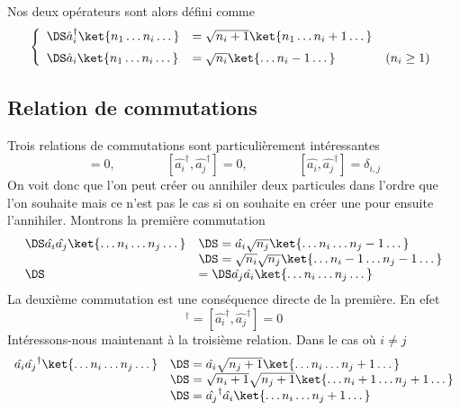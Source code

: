 Nos deux opérateurs sont alors défini comme
\begin{equation}
\left\{\begin{array}{ll}
\DS\hat{a}_i^\dagger \ket{n_1\dots n_i\dots} &= \sqrt{n_i+1}\ket{n_1\dots n_i+1\dots}\vspace{2mm}\\
\DS\hat{a}_i\ket{n_1\dots n_i\dots} &= \sqrt{n_i}\ket{\dots n_i-1\dots}\qquad\qquad (n_i\geq 1)
\end{array}\right.
\end{equation}

\subsection{Relation de commutations}
Trois relations de commutations sont particulièrement intéressantes
\begin{equation}
[\hat{a_i},\hat{a_j}]=0,\qquad\qquad[\hat{a_i}^\dagger,\hat{a_j}^\dagger]=0,\qquad\qquad [\hat{a_i},\hat{a_j}^\dagger]=\delta_{i,j}
\end{equation}
On voit donc que l'on peut créer ou annihiler deux particules dans l'ordre que l'on souhaite mais ce n'est pas le cas si 
on souhaite en créer une pour ensuite l'annihiler. Montrons la première commutation
\begin{equation}
\begin{array}{ll}
\DS\hat{a_i}\hat{a_j}\ket{\dots n_i\dots n_j\dots} &\DS= \hat{a_i}\sqrt{n_j}\ket{\dots n_i\dots n_j-1\dots}\\&\DS= \sqrt{n_i}\sqrt{n_j}\ket{\dots n_i-1\dots n_j-1\dots}\\
\DS&= \DS\hat{a_j}\hat{a_i}\ket{\dots n_i\dots n_j\dots} 
\end{array}
\end{equation}
La deuxième commutation est une conséquence directe de la première. En efet
\begin{equation}
[\hat{a_i},\hat{a_j}]^\dagger=[\hat{a_i}^\dagger,\hat{a_j}^\dagger]=0
\end{equation}
Intéressons-nous maintenant à la troisième relation. Dans le cas où $i\neq j$
\begin{equation}
\begin{array}{ll}
\hat{a_i}\hat{a_j}^\dagger\ket{\dots n_i\dots n_j\dots} &\DS = \hat{a_i}\sqrt{n_j+1}\ket{\dots n_i\dots n_j+1\dots}\\
&\DS = \sqrt{n_i+1}\sqrt{n_j+1}\ket{\dots n_i+1\dots n_j+1\dots}\\
&\DS = \hat{a_j}^\dagger\hat{a_i}\ket{\dots n_i\dots n_j+1\dots}
\end{array}
\end{equation}
